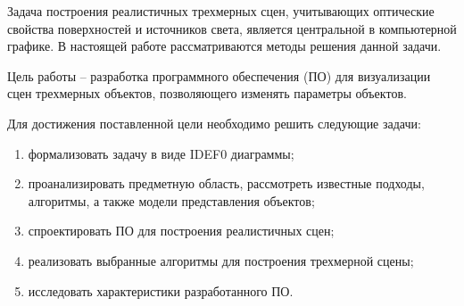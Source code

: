
Задача построения реалистичных трехмерных сцен, учитывающих оптические свойства поверхностей и источников света, является центральной в компьютерной графике. В настоящей работе рассматриваются методы решения данной задачи.

Цель работы -- разработка программного обеспечения (ПО) для визуализации сцен трехмерных объектов, позволяющего изменять параметры объектов.


Для достижения поставленной цели необходимо решить следующие задачи:
\begin{enumerate}
	\item формализовать задачу в виде IDEF0 диаграммы;
	\item проанализировать предметную область, рассмотреть известные подходы, алгоритмы, а также модели представления объектов;
	\item спроектировать ПО для построения реалистичных сцен;
	\item реализовать выбранные алгоритмы для построения трехмерной сцены;
	\item исследовать характеристики разработанного ПО.
\end{enumerate}

\clearpage
